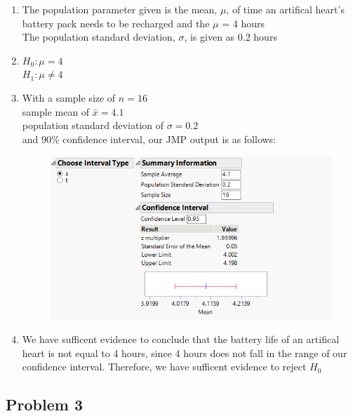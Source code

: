 \documentclass[14pt]{article}
\begin{document}
\begin{enumerate}[(a)]
\begin{enumerate}[1.]
\item
The population parameter given is the mean, $\mu$, of time an artifical heart's battery pack needs to be recharged and the $\mu$ = 4 hours \\
The population standard deviation, $\sigma$, is given as 0.2 hours

\item
$H_0 : \mu = 4$ \\
$H_1 : \mu \neq 4$

\item
With a sample size of $n = 16$ \\
sample mean of $\bar{x} = 4.1$ \\
population standard deviation of $\sigma = 0.2$ \\ 
and $90$\% confidence interval, our JMP output is as follows: 

\begin{figure}[h]
\centering
\includegraphics{exam2/2ii.png}
\end{figure}

\item
We have sufficent evidence to conclude that the battery life of an artifical heart is not equal to 4 hours, since 4 hours does not fall in the range of our confidence interval. Therefore, we have sufficent evidence to reject $H_0$

\end{enumerate}

\end{enumerate}

\pagebreak

\subsection*{Problem 3}
\end{document}
